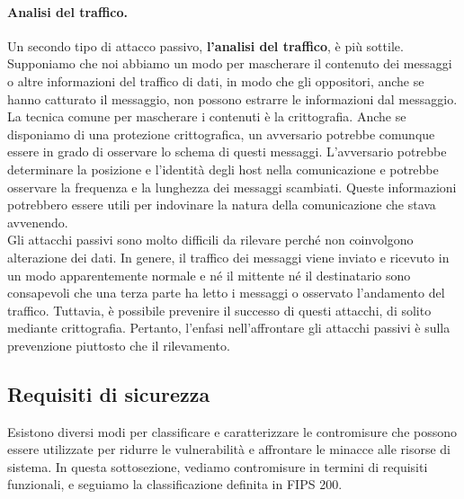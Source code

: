 \paragraph{Analisi del traffico.}
Un secondo tipo di attacco passivo, \textbf{l'analisi del traffico}, è più
sottile. Supponiamo che noi abbiamo un modo per mascherare il contenuto dei
messaggi o altre informazioni del traffico di dati, in modo che gli oppositori,
anche se hanno catturato il messaggio, non possono estrarre le informazioni dal
messaggio. La tecnica comune per mascherare i contenuti è la crittografia.
Anche se disponiamo di una protezione crittografica, un avversario potrebbe
comunque essere in grado di osservare lo schema di questi messaggi.
L'avversario potrebbe determinare la posizione e l'identità degli host nella
comunicazione e potrebbe osservare la frequenza e la lunghezza dei messaggi
scambiati. Queste informazioni potrebbero essere utili per indovinare la natura
della comunicazione che stava avvenendo.\\

Gli attacchi passivi sono molto difficili da rilevare perché non coinvolgono
alterazione dei dati. In genere, il traffico dei messaggi viene inviato e
ricevuto in un modo apparentemente normale e né il mittente né il destinatario
sono consapevoli che una terza parte ha letto i messaggi o osservato l'andamento
del traffico. Tuttavia, è possibile prevenire il successo di questi attacchi,
di solito mediante crittografia. Pertanto, l'enfasi nell'affrontare gli attacchi
passivi è sulla prevenzione piuttosto che il rilevamento.


\subsection{Requisiti di sicurezza}

Esistono diversi modi per classificare e caratterizzare le contromisure
che possono essere utilizzate per ridurre le vulnerabilità e affrontare le
minacce alle risorse di sistema. In questa sottosezione, vediamo contromisure
in termini di requisiti funzionali, e seguiamo la classificazione definita in
FIPS 200.

